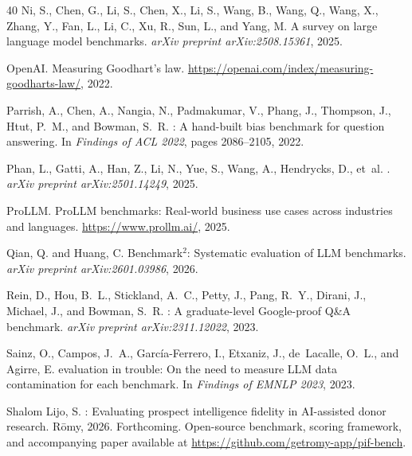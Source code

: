 \documentclass[11pt,a4paper]{article}
\begin{document}
\begin{thebibliography}{40}
Ni, S., Chen, G., Li, S., Chen, X., Li, S., Wang, B., Wang, Q., Wang, X., Zhang, Y., Fan, L., Li, C., Xu, R., Sun, L., and Yang, M.
\newblock A survey on large language model benchmarks.
\newblock \emph{arXiv preprint arXiv:2508.15361}, 2025.

OpenAI.
\newblock Measuring {Goodhart's} law.
\newblock \url{https://openai.com/index/measuring-goodharts-law/}, 2022.

Parrish, A., Chen, A., Nangia, N., Padmakumar, V., Phang, J., Thompson, J., Htut, P.~M., and Bowman, S.~R.
: A hand-built bias benchmark for question answering.
\newblock In \emph{Findings of ACL 2022}, pages 2086--2105, 2022.

Phan, L., Gatti, A., Han, Z., Li, N., Yue, S., Wang, A., Hendrycks, D., et~al.
.
\newblock \emph{arXiv preprint arXiv:2501.14249}, 2025.

ProLLM.
\newblock Pro{LLM} benchmarks: Real-world business use cases across industries and languages.
\newblock \url{https://www.prollm.ai/}, 2025.

Qian, Q. and Huang, C.
\newblock Benchmark$^{2}$: Systematic evaluation of {LLM} benchmarks.
\newblock \emph{arXiv preprint arXiv:2601.03986}, 2026.

Rein, D., Hou, B.~L., Stickland, A.~C., Petty, J., Pang, R.~Y., Dirani, J., Michael, J., and Bowman, S.~R.
: A graduate-level {Google}-proof {Q\&A} benchmark.
\newblock \emph{arXiv preprint arXiv:2311.12022}, 2023.

Sainz, O., Campos, J.~A., Garc\'{i}a-Ferrero, I., Etxaniz, J., de~Lacalle, O.~L., and Agirre, E.
 evaluation in trouble: On the need to measure {LLM} data contamination for each benchmark.
\newblock In \emph{Findings of EMNLP 2023}, 2023.

Shalom Lijo, S.
: Evaluating prospect intelligence fidelity in {AI}-assisted donor research.
\newblock R\={o}my, 2026. Forthcoming.
\newblock Open-source benchmark, scoring framework, and accompanying paper available at \url{https://github.com/getromy-app/pif-bench}.


\end{thebibliography}
\end{document}
